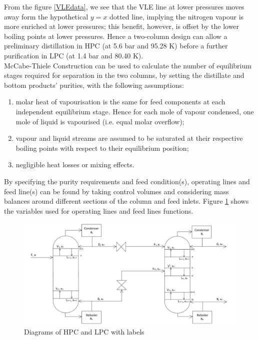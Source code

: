 \documentclass[11pt,oneside]{article}
\begin{document}
        \noindent From the figure \ref{VLEdata}, we see that the VLE line at lower pressures moves away form the hypothetical $y=x$ dotted line, implying the nitrogen vapour is more enriched at lower pressures; this benefit, however, is offset by the lower boiling points at lower pressures. Hence a two-column design can allow a preliminary distillation in HPC (at 5.6 bar and 95.28 K) before a further purification in LPC (at 1.4 bar and 80.40 K). \\
        McCabe-Thiele Construction can be used to calculate the number of equilibrium stages required for separation in the two columns, by setting the distillate and bottom products' purities, with the following assumptions:
        \begin{enumerate}
            \item molar heat of vapourisation is the same for feed components at each independent equilibrium stage. Hence for each mole of vapour condensed, one mole of liquid is vapourised (i.e. equal molar overflow);
            \item vapour and liquid streams are assumed to be saturated at their respective boiling points with respect to their equilibrium position;
            \item negligible heat losses or mixing effects.
        \end{enumerate}
        By specifying the purity requirements and feed condition(s), operating lines and feed line(s) can be found by taking control volumes and considering mass balances around different sections of the column and feed inlets. Figure \ref{labelled_columns_diagram} shows the variables used for operating lines and feed lines functions.
        \begin{figure}[H]
            \centering
            \includegraphics[scale=0.43]{labelled_columns_diagram.jpg}
            \caption{Diagrams of HPC and LPC with labels}
            \label{labelled_columns_diagram}
        \end{figure}
\end{document}
